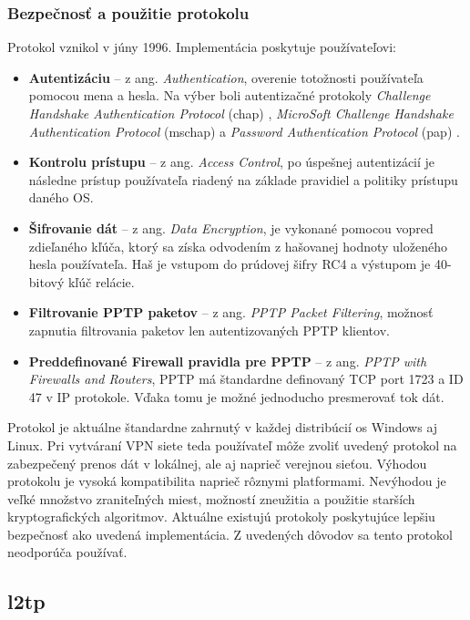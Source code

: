 \subsubsection{Bezpečnosť a použitie protokolu} 
Protokol vznikol v júny 1996. Implementácia poskytuje používateľovi:
\begin{itemize}
	\item{\textbf{Autentizáciu}} -- z ang. \textit{Authentication}, overenie totožnosti používateľa pomocou mena a hesla. Na výber boli autentizačné protokoly \textit{Challenge Handshake Authentication Protocol} (\acrshort{chap}) \cite{chap}, \textit{MicroSoft Challenge Handshake Authentication Protocol} (\acrshort{mschap}) \cite{mschap} a \textit{Password Authentication Protocol} (\acrshort{pap}) \cite{pap}.  
	\item{\textbf{Kontrolu prístupu}} -- z ang. \textit{Access Control}, po úspešnej autentizácií je následne prístup používateľa riadený na základe pravidiel a politiky prístupu daného OS. 
	\item{\textbf{Šifrovanie dát}} -- z ang. \textit{Data Encryption}, je vykonané pomocou vopred zdieľaného kľúča, ktorý sa získa odvodením z hašovanej hodnoty uloženého hesla používateľa. Haš je vstupom do prúdovej šifry RC4 \cite{rc4} a výstupom je  40-bitový kľúč relácie. 
	\item{\textbf{Filtrovanie PPTP paketov}} -- z ang. \textit{PPTP Packet Filtering}, možnosť zapnutia filtrovania paketov len autentizovaných PPTP klientov.
	\item{\textbf{Preddefinované Firewall pravidla pre PPTP}} -- z ang. \textit{PPTP with Firewalls and Routers}, PPTP má štandardne definovaný TCP port 1723 a ID 47 v IP protokole. Vďaka tomu je možné jednoducho presmerovať tok dát.
\end{itemize} 

Protokol je aktuálne štandardne zahrnutý v každej distribúcií \acrshort{os} Windows aj Linux. Pri vytváraní VPN siete teda používateľ môže zvoliť uvedený protokol na zabezpečený prenos dát v lokálnej, ale aj naprieč verejnou sieťou. Výhodou protokolu je vysoká kompatibilita naprieč rôznymi platformami. Nevýhodou je veľké množstvo zraniteľných miest, možností zneužitia a použitie starších kryptografických algoritmov. Aktuálne existujú protokoly poskytujúce lepšiu bezpečnosť ako uvedená implementácia. Z uvedených dôvodov sa tento protokol neodporúča používať.


\subsection{\acrfull{l2tp}}
